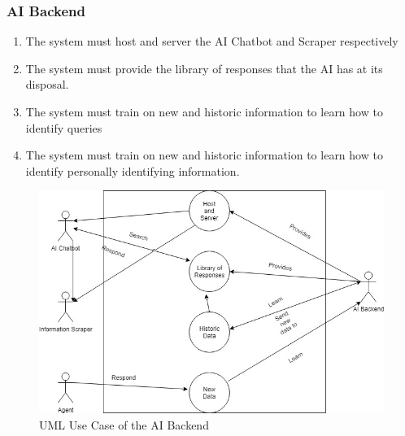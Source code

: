 \documentclass[11pt]{article}
\begin{document}
\subsubsection{AI Backend}
\begin{enumerate}[label=R4.\arabic*.]
	\item The system must host and server the AI Chatbot and Scraper respectively
	\item The system must provide the library of responses that the AI has at its disposal.
	\item The system must train on new and historic information to learn how to identify queries
	\item The system  must train on new and historic information to learn how to identify personally identifying information.
\end{enumerate}

\begin{figure}[H]
	\centering
	\includegraphics[width=1.0\textwidth]{../../images/AI_Backend_UCD.jpg}
	\caption{UML Use Case of the AI Backend}
\end{figure}
\end{document}
